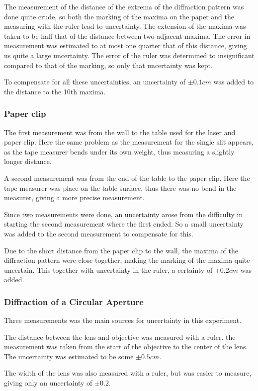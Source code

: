 \documentclass{emulateapj}
\begin{document}
The measurement of the distance of the extrema of the diffraction pattern was done quite crude, so both the marking of the maxima on the paper and the measuring with the ruler lead to uncertainty. The extension of the maxima was taken to be half that of the distance between two adjacent maxima. The error in measurement was estimated to at most one quarter that of this distance, giving us quite a large uncertainty. The error of the ruler was determined to insignificant compared to that of the marking, so only that uncertainty was kept.

To compensate for all these uncertainties, an uncertainty of $\pm 0.1 cm$ was added to the distance to the 10th maxima.


\subsubsection{Paper clip}
The first measurement was from the wall to the table used for the laser and paper clip. Here the same problem as the measurement for the single slit appears, as the tape measurer bends under its own weight, thus measuring a slightly longer distance. 

A second measurement was from the end of the table to the paper clip. Here the tape measurer was place on the table surface, thus there was no bend in the measurer, giving a more precise measurement. 

Since two measurements were done, an uncertainty arose from the difficulty in starting the second measurement where the first ended. So a small uncertainty was added to the second measurement to compensate for this.

Due to the short distance from the paper clip to the wall, the maxima of the diffraction pattern were close together, making the marking of the maxima quite uncertain. This together with uncertainty in the ruler, a certainty of $\pm 0.2 cm$ was added. 

\subsubsection{Diffraction of a Circular Aperture}
Three measurements was the main sources for uncertainty in this experiment.

The distance between the lens and objective was measured with a ruler. the measurement was taken from the start of the objective to the center of the lens. The uncertainty was estimated to be some $\pm 0.5 cm$.

The width of the lens was also measured with a ruler, but was easier to measure, giving only an uncertainty of $\pm 0.2$.
\end{document}
